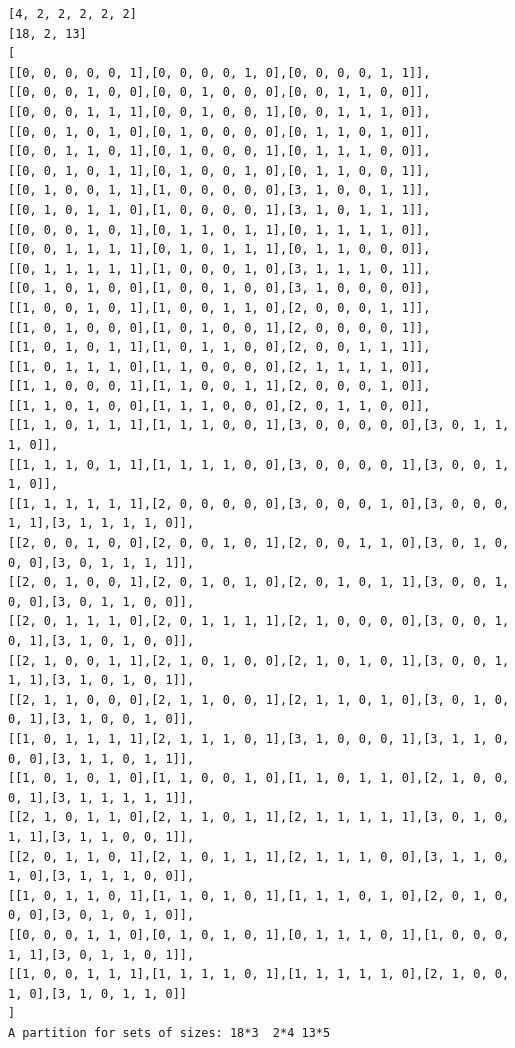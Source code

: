 \documentclass[final]{dmtcs-episciences}
\begin{document}
\begin{appendices}
\begin{verbatim} 
[4, 2, 2, 2, 2, 2]
[18, 2, 13]
[
[[0, 0, 0, 0, 0, 1],[0, 0, 0, 0, 1, 0],[0, 0, 0, 0, 1, 1]],
[[0, 0, 0, 1, 0, 0],[0, 0, 1, 0, 0, 0],[0, 0, 1, 1, 0, 0]],
[[0, 0, 0, 1, 1, 1],[0, 0, 1, 0, 0, 1],[0, 0, 1, 1, 1, 0]],
[[0, 0, 1, 0, 1, 0],[0, 1, 0, 0, 0, 0],[0, 1, 1, 0, 1, 0]],
[[0, 0, 1, 1, 0, 1],[0, 1, 0, 0, 0, 1],[0, 1, 1, 1, 0, 0]],
[[0, 0, 1, 0, 1, 1],[0, 1, 0, 0, 1, 0],[0, 1, 1, 0, 0, 1]],
[[0, 1, 0, 0, 1, 1],[1, 0, 0, 0, 0, 0],[3, 1, 0, 0, 1, 1]],
[[0, 1, 0, 1, 1, 0],[1, 0, 0, 0, 0, 1],[3, 1, 0, 1, 1, 1]],
[[0, 0, 0, 1, 0, 1],[0, 1, 1, 0, 1, 1],[0, 1, 1, 1, 1, 0]],
[[0, 0, 1, 1, 1, 1],[0, 1, 0, 1, 1, 1],[0, 1, 1, 0, 0, 0]],
[[0, 1, 1, 1, 1, 1],[1, 0, 0, 0, 1, 0],[3, 1, 1, 1, 0, 1]],
[[0, 1, 0, 1, 0, 0],[1, 0, 0, 1, 0, 0],[3, 1, 0, 0, 0, 0]],
[[1, 0, 0, 1, 0, 1],[1, 0, 0, 1, 1, 0],[2, 0, 0, 0, 1, 1]],
[[1, 0, 1, 0, 0, 0],[1, 0, 1, 0, 0, 1],[2, 0, 0, 0, 0, 1]],
[[1, 0, 1, 0, 1, 1],[1, 0, 1, 1, 0, 0],[2, 0, 0, 1, 1, 1]],
[[1, 0, 1, 1, 1, 0],[1, 1, 0, 0, 0, 0],[2, 1, 1, 1, 1, 0]],
[[1, 1, 0, 0, 0, 1],[1, 1, 0, 0, 1, 1],[2, 0, 0, 0, 1, 0]],
[[1, 1, 0, 1, 0, 0],[1, 1, 1, 0, 0, 0],[2, 0, 1, 1, 0, 0]],
[[1, 1, 0, 1, 1, 1],[1, 1, 1, 0, 0, 1],[3, 0, 0, 0, 0, 0],[3, 0, 1, 1, 1, 0]],
[[1, 1, 1, 0, 1, 1],[1, 1, 1, 1, 0, 0],[3, 0, 0, 0, 0, 1],[3, 0, 0, 1, 1, 0]],
[[1, 1, 1, 1, 1, 1],[2, 0, 0, 0, 0, 0],[3, 0, 0, 0, 1, 0],[3, 0, 0, 0, 1, 1],[3, 1, 1, 1, 1, 0]],
[[2, 0, 0, 1, 0, 0],[2, 0, 0, 1, 0, 1],[2, 0, 0, 1, 1, 0],[3, 0, 1, 0, 0, 0],[3, 0, 1, 1, 1, 1]],
[[2, 0, 1, 0, 0, 1],[2, 0, 1, 0, 1, 0],[2, 0, 1, 0, 1, 1],[3, 0, 0, 1, 0, 0],[3, 0, 1, 1, 0, 0]],
[[2, 0, 1, 1, 1, 0],[2, 0, 1, 1, 1, 1],[2, 1, 0, 0, 0, 0],[3, 0, 0, 1, 0, 1],[3, 1, 0, 1, 0, 0]],
[[2, 1, 0, 0, 1, 1],[2, 1, 0, 1, 0, 0],[2, 1, 0, 1, 0, 1],[3, 0, 0, 1, 1, 1],[3, 1, 0, 1, 0, 1]],
[[2, 1, 1, 0, 0, 0],[2, 1, 1, 0, 0, 1],[2, 1, 1, 0, 1, 0],[3, 0, 1, 0, 0, 1],[3, 1, 0, 0, 1, 0]],
[[1, 0, 1, 1, 1, 1],[2, 1, 1, 1, 0, 1],[3, 1, 0, 0, 0, 1],[3, 1, 1, 0, 0, 0],[3, 1, 1, 0, 1, 1]],
[[1, 0, 1, 0, 1, 0],[1, 1, 0, 0, 1, 0],[1, 1, 0, 1, 1, 0],[2, 1, 0, 0, 0, 1],[3, 1, 1, 1, 1, 1]],
[[2, 1, 0, 1, 1, 0],[2, 1, 1, 0, 1, 1],[2, 1, 1, 1, 1, 1],[3, 0, 1, 0, 1, 1],[3, 1, 1, 0, 0, 1]],
[[2, 0, 1, 1, 0, 1],[2, 1, 0, 1, 1, 1],[2, 1, 1, 1, 0, 0],[3, 1, 1, 0, 1, 0],[3, 1, 1, 1, 0, 0]],
[[1, 0, 1, 1, 0, 1],[1, 1, 0, 1, 0, 1],[1, 1, 1, 0, 1, 0],[2, 0, 1, 0, 0, 0],[3, 0, 1, 0, 1, 0]],
[[0, 0, 0, 1, 1, 0],[0, 1, 0, 1, 0, 1],[0, 1, 1, 1, 0, 1],[1, 0, 0, 0, 1, 1],[3, 0, 1, 1, 0, 1]],
[[1, 0, 0, 1, 1, 1],[1, 1, 1, 1, 0, 1],[1, 1, 1, 1, 1, 0],[2, 1, 0, 0, 1, 0],[3, 1, 0, 1, 1, 0]]
]
A partition for sets of sizes: 18*3  2*4 13*5
\end{verbatim}
\newpage


\end{appendices}
\end{document}
